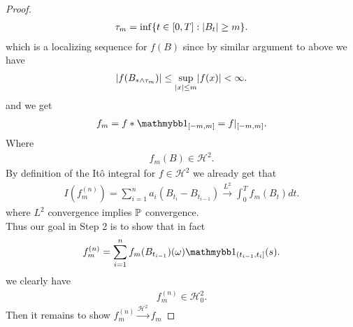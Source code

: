\begin{proof}
\begin{align*}
  \tau_m = \inf \{t \in [0,T] :  \abs{B_t} \ge  m\}  
.\end{align*}
which is a localizing sequence for $f(B)$ since by similar argument to above we have 
\begin{align*}
  \abs{f(B_{* \land \tau_m})} \le  \sup_{\abs{x} \le m} \abs{f(x)} < \infty
.\end{align*}
and we get 
\begin{align*}
  f_m = f*\cha_{[-m,m]}  = f\rvert_{[-m,m]}
.\end{align*}
Where 
\begin{align*}
  f_m(B) \in  \mathcal{H}^2
.\end{align*}
By definition of the It\^o integral for $f \in \mathcal{H}^2$ we already get that  
\begin{align*}
  I(f_m^{(n)} ) = \sum_{i=1}^{n} a_i (B_{t_{i}}  - B_{t_{i-1}}) \xrightarrow{L^2} \int_0^{T}  f_m(B_t) dt 
.\end{align*}
where $L^2$ convergence implies $\P$ convergence. \\[1ex]
Thus our goal in Step 2 is to show that  in fact
\begin{align*}
  f_m^{(n)}   = \sum_{i=1}^{n}  f_m(B_{t_{i-1}})(\omega )\cha_{(t_{i-1},t_i]}(s) 
.\end{align*}
we clearly have
\begin{align*}
  f_m^{(n)}   \in  \mathcal{H}_{0}^2
.\end{align*}
Then it  remains to show $f_m^{(n)} \xrightarrow{\mathcal{H}^{2} } f_m $ 

\end{proof}
